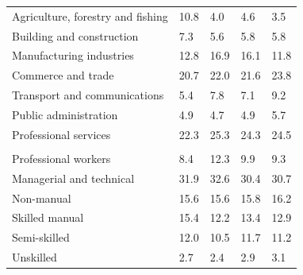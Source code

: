 \documentclass{article}
\begin{document}
\begin{table}[h]
\begin{tabular}{KTTTT}
    \hline
Agriculture, forestry and fishing  & 10.8&  4.0&  4.6&  3.5\\
Building and construction & 7.3& 5.6& 5.8& 5.8\\
Manufacturing industries & 12.8& 16.9& 16.1& 11.8\\
Commerce and trade  & 20.7& 22.0& 21.6& 23.8\\
Transport and communications  & 5.4& 7.8& 7.1& 9.2\\
Public administration & 4.9& 4.7& 4.9& 5.7\\
Professional services & 22.3& 25.3& 24.3& 24.5\\
\hline
    \\ 
    \hline
Professional workers  &  8.4& 12.3 &  9.9&  9.3\\
Managerial and technical & 31.9& 32.6& 30.4& 30.7\\
Non-manual & 15.6& 15.6& 15.8& 16.2\\
Skilled manual & 15.4& 12.2& 13.4& 12.9\\
Semi-skilled & 12.0& 10.5& 11.7& 11.2\\
Unskilled  & 2.7& 2.4& 2.9& 3.1\\
\end{tabular}
\end{table}
\pagebreak
\end{document}
